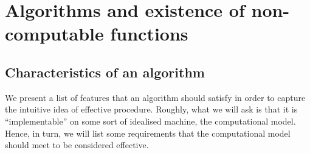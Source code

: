 \documentclass{amsbook}
\theoremstyle{definition}
\theoremstyle{remark}
\numberwithin{section}{chapter}
\numberwithin{equation}{chapter}
\begin{document}
\chapter{Algorithms and existence of non-computable functions}

\section{Characteristics of an algorithm}
\label{se:alg-char}

We present a list of features that an algorithm should satisfy in
order to capture the intuitive idea of effective procedure. Roughly,
what we will ask is that it is ``implementable'' on some sort of
idealised machine, the computational model. Hence, in turn, we will
list some requirements that the computational model should meet to be
considered effective.
\end{document}
